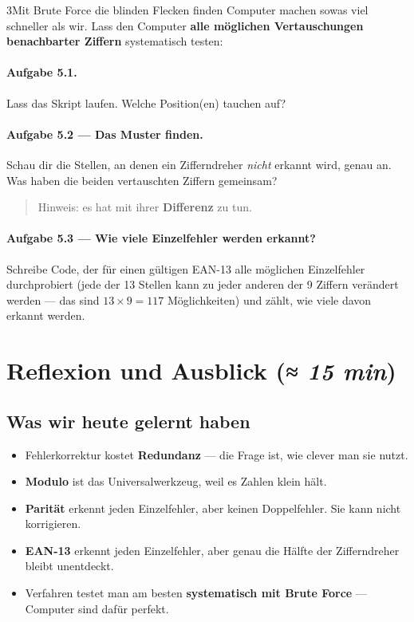 \begin{pythoneinheit}{3}{Mit Brute Force die blinden Flecken finden}
Computer machen sowas viel schneller als wir. Lass den Computer
\textbf{alle möglichen Vertauschungen benachbarter Ziffern}
systematisch testen:


\paragraph{Aufgabe 5.1.}
Lass das Skript laufen. Welche Position(en) tauchen auf?

\paragraph{Aufgabe 5.2 — Das Muster finden.}
Schau dir die Stellen, an denen ein Zifferndreher \emph{nicht} erkannt
wird, genau an. Was haben die beiden vertauschten Ziffern gemeinsam?

\begin{quote}
Hinweis: es hat mit ihrer \textbf{Differenz} zu tun.
\end{quote}

\paragraph{Aufgabe 5.3 — Wie viele Einzelfehler werden erkannt?}
Schreibe Code, der für einen gültigen EAN-13 alle möglichen
Einzelfehler durchprobiert (jede der 13 Stellen kann zu jeder anderen
der 9 Ziffern verändert werden — das sind $13 \times 9 = 117$
Möglichkeiten) und zählt, wie viele davon erkannt werden.
\end{pythoneinheit}

\section{Reflexion und Ausblick \normalfont(\textit{≈ 15 min})}

\subsection*{Was wir heute gelernt haben}

\begin{itemize}
\item Fehlerkorrektur kostet \textbf{Redundanz} — die Frage ist, wie
  clever man sie nutzt.
\item \textbf{Modulo} ist das Universalwerkzeug, weil es Zahlen klein
  hält.
\item \textbf{Parität} erkennt jeden Einzelfehler, aber keinen
  Doppelfehler. Sie kann nicht korrigieren.
\item \textbf{EAN-13} erkennt jeden Einzelfehler, aber genau die Hälfte
  der Zifferndreher bleibt unentdeckt.
\item Verfahren testet man am besten \textbf{systematisch mit Brute
  Force} — Computer sind dafür perfekt.
\end{itemize}

